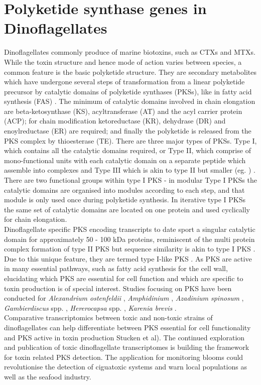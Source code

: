 \documentclass[12pt]{article}
\begin{document}
\section{Polyketide synthase genes in Dinoflagellates}
Dinoflagellates commonly produce of marine biotoxins, such as CTXs and MTXs. While the toxin structure and hence mode of action varies between species, a common feature is the basic polyketide structure. They are secondary metabolites which have undergone several steps of transformation from a linear polyketide precursor by catalytic domains of polyketide synthases (PKSs), like in fatty acid synthesis (FAS) \cite{rein1999polyketides}. %
The minimum of catalytic domains involved in chain elongation are beta-ketosynthase (KS), acyltransferase (AT) and the acyl carrier protein (ACP); for chain modification ketoreductase (KR), dehydrase (DR) and enoylreductase (ER) are required; and finally the polyketide is released from the PKS complex by thioesterase (TE). There are three major types of PKSs. Type I, which contains all the catalytic domains required, or Type II, which comprise of mono-functional units with each catalytic domain on a separate peptide which assemble into complexes and Type III which is akin to type II but smaller (eg. \cite{eichholz2012putative})  . There are two functional groups within type I PKS - in modular Type I PKSs the catalytic domains are organised into modules according to each step, and that module is only used once during polyketide synthesis. In iterative type I PKSs the same set of catalytic domains are located on  one protein and used cyclically for chain elongation.\\ 
Dinoflagellate specific PKS encoding transcripts to date sport a singular catalytic domain for approximately 50 - 100 kDa proteins, reminiscent of the multi protein complex formation of type II PKS but sequence similarity is akin to type I PKS \cite{monroe2008toxic,eichholz2012putative}. Due to this unique feature, they are termed type I-like PKS \cite{monroe2010characterization}.
As PKS are active in many essential pathways, such as fatty acid synthesis for the cell wall, elucidating which PKS are essential for cell function and which are specific to toxin production is of special interest. Studies focusing on PKS have been conducted for \emph{Alexandrium ostenfeldii} \cite{eichholz2012putative}, \emph{Amphidinium} \cite{murray2012genetic}, \emph{Azadinium spinosum} \cite{meyer20152transcriptomic}, \emph{Gambierdiscus} spp. \cite{pawlowiez2014transcriptome,kohli2015polyketide}, \emph{Hererocapsa} spp. \cite{eichholz2012putative,salcedo2012dozens}, \emph{Karenia brevis} \cite{monroe2008toxic,ryan2014novo}.  \\ %
Comparative transcriptomics between toxic and non-toxic strains of dinoflagellates can help differentiate between PKS essential for cell functionality and PKS active in toxin production \cite{kohli2015polyketide}Stucken et al). The continued exploration and publication of toxic dinoflagellate transcriptomes is building the framework for toxin related PKS detection. The application for monitoring blooms could revolutionise the detection of ciguatoxic systems and warn local populations as well as the seafood industry.
\end{document}
